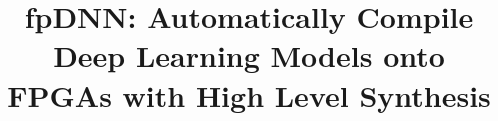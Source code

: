 \documentclass{acm_proc_article-sp-copy}
\begin{document}
	
\title{fpDNN: Automatically Compile Deep Learning Models onto FPGAs with High Level Synthesis}

%
%
%
%
%

%

\end{document}
